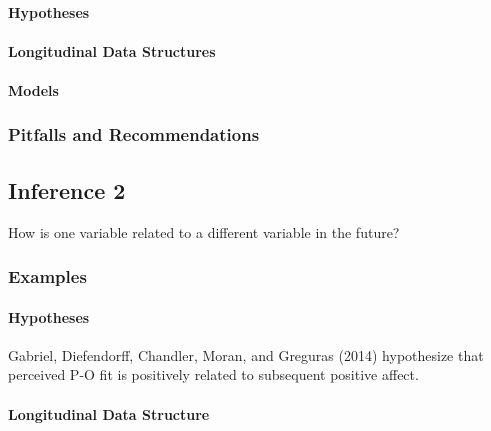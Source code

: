 \documentclass[english,,man]{apa6}
\let\oldparagraph\paragraph
\renewcommand{\paragraph}[1]{\oldparagraph{#1}\mbox{}}
\theoremstyle{definition}
\theoremstyle{definition}
\theoremstyle{definition}
\theoremstyle{remark}
\begin{document}
\hypertarget{hypotheses-7}{%
\paragraph{Hypotheses}\label{hypotheses-7}}

\hypertarget{longitudinal-data-structures-2}{%
\paragraph{Longitudinal Data
Structures}\label{longitudinal-data-structures-2}}

\hypertarget{models-7}{%
\paragraph{Models}\label{models-7}}

\hypertarget{pitfalls-and-recommendations-7}{%
\subsubsection{Pitfalls and
Recommendations}\label{pitfalls-and-recommendations-7}}

\hypertarget{inference-2-1}{%
\subsection{Inference 2}\label{inference-2-1}}

How is one variable related to a different variable in the future?

\hypertarget{examples-8}{%
\subsubsection{Examples}\label{examples-8}}

\hypertarget{hypotheses-8}{%
\paragraph{Hypotheses}\label{hypotheses-8}}

Gabriel, Diefendorff, Chandler, Moran, and Greguras (2014) hypothesize
that perceived P-O fit is positively related to subsequent positive
affect.

\hypertarget{longitudinal-data-structure-5}{%
\paragraph{Longitudinal Data
Structure}\label{longitudinal-data-structure-5}}
\end{document}
